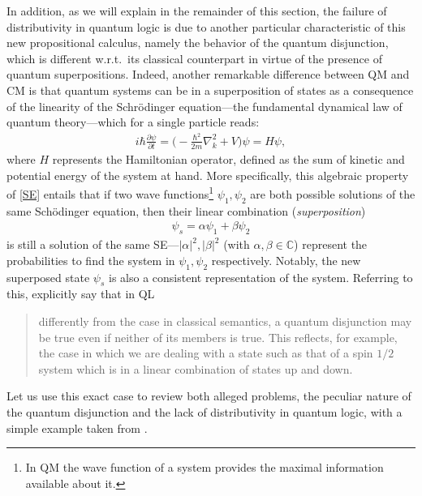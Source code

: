 \documentclass[11pt, executivepaper]{article}
\begin{document}
In addition, as we will explain in the remainder of this section, the failure of distributivity in quantum logic is due to another particular characteristic of this new propositional calculus, namely the behavior of the quantum disjunction, which is different w.r.t.\ its classical counterpart in virtue of the presence of quantum superpositions. Indeed, another remarkable difference between QM  and CM is that quantum systems can be in a superposition of states as a consequence of the linearity of the Schr\"odinger equation---the fundamental dynamical law of quantum theory---which for a single particle reads: 
\begin{align}
	\label{SE}
	i\hbar\frac{\partial\psi}{\partial t}=\Big(-\frac{\hbar^2}{2m}\nabla_k^2+V\Big)\psi=H\psi,
\end{align}
\noindent where $H$ represents the Hamiltonian operator, defined as the sum of kinetic and potential energy of the system at hand. More specifically, this algebraic property of \eqref{SE} entails that if two wave functions\footnote{In QM the wave function of a system provides the maximal information available about it.} $\psi_1, \psi_2$ are both possible solutions of the same Sch\"odinger equation, then their linear combination (\emph{superposition}) 
\begin{align}
	\psi_s=\alpha\psi_{1}+\beta\psi_{2} \nonumber
\end{align} 
is still a solution of the same SE---$|\alpha|^2,|\beta|^2$ (with $\alpha,\beta\in\mathbb{C}$) represent the probabilities to find the system in $\psi_1, \psi_2$ respectively. Notably, the new superposed state $\psi_s$ is also a consistent representation of the system. Referring to this,  \cite{deRonde:2016} explicitly say that in QL 
\begin{quote}
	differently from the case in classical semantics, a quantum disjunction may be true even if neither of its members is true. This reflects, for example, the case in which we are dealing with a state such as that of a spin $1/2$ system which is in a linear combination of states up and down.
\end{quote}
\noindent Let us use this exact case to review both alleged problems, the peculiar nature of the quantum disjunction and the lack of distributivity in quantum logic, with a simple example taken from \cite{Giuntini:2002}.
\end{document}
